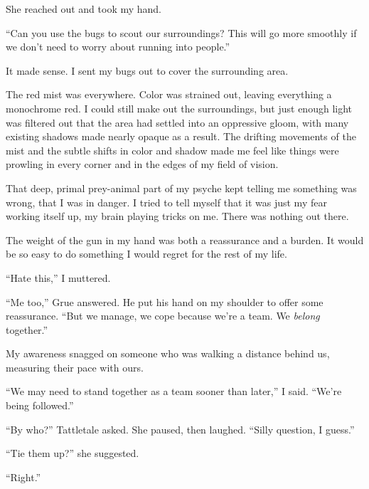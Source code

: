 She reached out and took my hand.



``Can you use the bugs to scout our surroundings?  This will go more smoothly if we don't need to worry about running into people.''



It made sense.  I sent my bugs out to cover the surrounding area.



The red mist was everywhere.  Color was strained out, leaving everything a monochrome red.  I could still make out the surroundings, but just enough light was filtered out that the area had settled into an oppressive gloom, with many existing shadows made nearly opaque as a result.  The drifting movements of the mist and the subtle shifts in color and shadow made me feel like things were prowling in every corner and in the edges of my field of vision.



That deep, primal prey-animal part of my psyche kept telling me something was wrong, that I was in danger.  I tried to tell myself that it was just my fear working itself up, my brain playing tricks on me.  There was nothing out there.



The weight of the gun in my hand was both a reassurance and a burden.  It would be so easy to do something I would regret for the rest of my life.



``Hate this,'' I muttered.



``Me too,'' Grue answered.  He put his hand on my shoulder to offer some reassurance.  ``But we manage, we cope because we're a team.  We \emph{belong} together.''



My awareness snagged on someone who was walking a distance behind us, measuring their pace with ours.



``We may need to stand together as a team sooner than later,'' I said. ``We're being followed.''



``By who?'' Tattletale asked.  She paused, then laughed.  ``Silly question, I guess.''



``Tie them up?''  she suggested.



``Right.''



